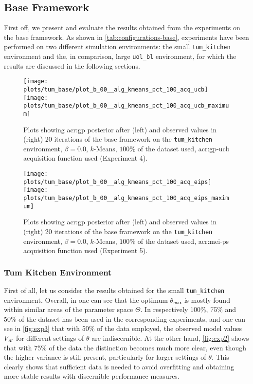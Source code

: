 \subsection{Base Framework}
\label{sec:base-framework-results}

First off, we present and evaluate the results obtained from the experiments on the base framework.
As shown in \autoref{tab:configurations-base}, experiments have been performed on two different simulation environments: the small \texttt{tum\_kitchen} environment and the, in comparison, large \texttt{uol\_bl} environment, for which the results are discussed in the following sections.

	\begin{figure}
		\centering
		\texttt{[image: plots/tum\_base/plot\_b\_00\_\_alg\_kmeans\_pct\_100\_acq\_ucb]}
		\texttt{[image: plots/tum\_base/plot\_b\_00\_\_alg\_kmeans\_pct\_100\_acq\_ucb\_maximum]}
		\caption{Plots showing \acrshort{acr:gp}  posterior after (left) and observed values in (right) 20 iterations of the base framework on the \texttt{tum\_kitchen} environment, $\beta = 0.0$, $k$-Means, $100\%$ of the dataset used, \acrshort{acr:gp-ucb} acquisition function used (Experiment 4).}
		\label{fig:exp4}
	\end{figure}
	\begin{figure}
		\centering
		\texttt{[image: plots/tum\_base/plot\_b\_00\_\_alg\_kmeans\_pct\_100\_acq\_eips]}
		\texttt{[image: plots/tum\_base/plot\_b\_00\_\_alg\_kmeans\_pct\_100\_acq\_eips\_maximum]}
		\caption{Plots showing \acrshort{acr:gp} posterior after (left) and observed values in (right) 20 iterations of the base framework on the \texttt{tum\_kitchen} environment, $\beta = 0.0$, $k$-Means, $100\%$ of the dataset used, \acrshort{acr:mei-ps} acquisition function used (Experiment 5).}
		\label{fig:exp5}
	\end{figure}

\subsubsection{Tum Kitchen Environment}

First of all, let us consider the results obtained for the small \texttt{tum\_kitchen} environment.
Overall, in  one can see that the optimum $\theta_\mathsf{max}$ is mostly found within similar areas of the parameter space $\Theta$.
In  respectively 100\%, 75\% and 50\% of the dataset has been used in the corresponding experiments, and one can see in \autoref{fig:exp3} that with 50\% of the data employed, the observed model values $V_\mathcal{M}$ for different settings of $\theta$ are indiscernible.
At the other hand, \autoref{fig:exp2} shows that with 75\% of the data the distinction becomes much more clear, even though the higher variance is still present, particularly for larger settings of $\theta$.
This clearly shows that sufficient data is needed to avoid overfitting and obtaining more stable results with discernible performance measures.

